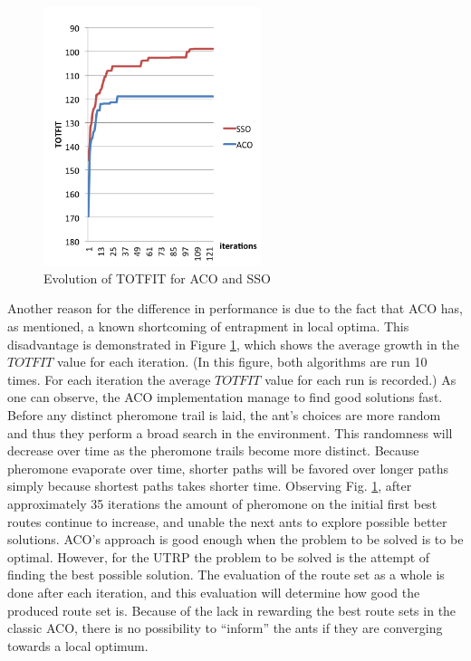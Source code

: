  \begin{figure}[H]
    \begin{center}
    \includegraphics[width=2.5in]{assets/acovsssoNEW.png}
    \end{center}
    \caption{Evolution of TOTFIT for ACO and SSO }
    \label{fig:acovssso} 
\end{figure}

Another reason for the difference in performance is due to the fact that ACO has, as mentioned, a known shortcoming of entrapment in local optima. This disadvantage is demonstrated in Figure \ref{fig:acovssso}, which shows the average growth in the $TOTFIT$ value for each iteration. (In this figure, both algorithms are run 10 times. For each iteration the average $TOTFIT$ value for each run is recorded.) As one can observe, the ACO implementation manage to find good solutions fast. Before any distinct pheromone trail is laid, the ant's choices are more random and thus they perform a broad search in the environment. This randomness will decrease over time as the pheromone trails become more distinct. Because pheromone evaporate over time, shorter paths will be favored over longer paths simply because shortest paths takes shorter time. Observing Fig. \ref{fig:acovssso}, after approximately 35 iterations the amount of pheromone on the initial first best routes continue to increase, and unable the next ants to explore possible better solutions. ACO's approach is good enough when the problem to be solved is to be optimal. However, for the UTRP the problem to be solved is the attempt of finding the best possible solution. The evaluation of the route set as a whole is done after each iteration, and this evaluation will determine how good the produced route set is. Because of the lack in rewarding the best route sets in the classic ACO, there is no possibility to ``inform'' the ants if they are converging towards a local optimum.

